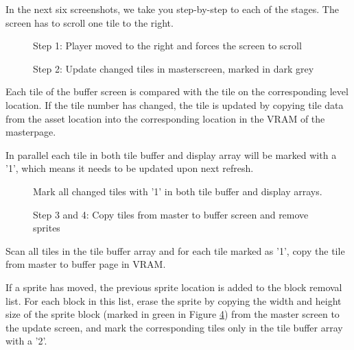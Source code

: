 \documentclass[book.tex]{subfiles}
\begin{document}
In the next six screenshots, we take you step-by-step to each of the stages. The screen has to scroll one tile to the right. \\

\begin{figure}[H]
\centering
 \caption{Step 1: Player moved to the right and forces the screen to scroll}
 \label{fig:kc1_3_start}
\end{figure}

\begin{figure}[H]
\centering
 \caption{Step 2: Update changed tiles in masterscreen, marked in dark grey}
 \label{fig:kc1_3_update_masterscreen}
\end{figure}

Each tile of the buffer screen is compared with the tile on the corresponding level location. If the tile number has changed, the tile is updated by copying tile data from the asset location into the corresponding location in the VRAM of the masterpage.\\
\par
In parallel each tile in both tile buffer and display array will be marked with a '1', which means it needs to be updated upon next refresh.

\begin{figure}[H]
\centering
 \caption{Mark all changed tiles with '1' in both tile buffer and display arrays.}
 \label{fig:kc1_3_update_refresh_img_1}
\end{figure}


\pagebreak

\begin{figure}[H]
\centering
 \caption{Step 3 and 4: Copy tiles from master to buffer screen and remove sprites}
 \label{fig:kc1_3_update_remove}
\end{figure}

Scan all tiles in the tile buffer array and for each tile marked as '1', copy the tile from master to buffer page in VRAM.\\
\par
If a sprite has moved, the previous sprite location is added to the block removal list. For each block in this list, erase the sprite by copying the width and height size of the sprite block (marked in green in Figure \ref{fig:kc1_3_update_remove}) from the master screen to the update screen, and mark the corresponding tiles only in the tile buffer array with a '2'.
\end{document}
